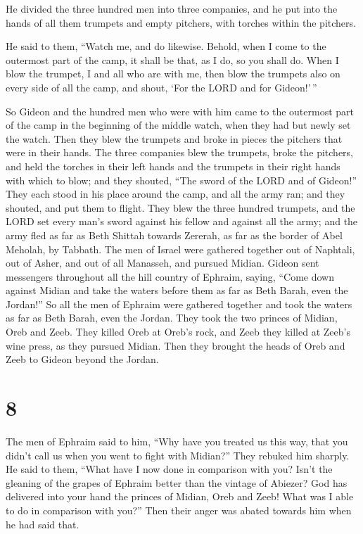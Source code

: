  He divided the three hundred men into three companies,
and he put into the hands of all them trumpets and empty pitchers, with
torches within the pitchers.

 He said to them, ``Watch me, and do likewise. Behold,
when I come to the outermost part of the camp, it shall be that, as I
do, so you shall do.  When I blow the trumpet, I and all
who are with me, then blow the trumpets also on every side of all the
camp, and shout, `For the LORD and for Gideon!'\,''

 So Gideon and the hundred men who were with him came to
the outermost part of the camp in the beginning of the middle watch,
when they had but newly set the watch. Then they blew the trumpets and
broke in pieces the pitchers that were in their hands. 
The three companies blew the trumpets, broke the pitchers, and held the
torches in their left hands and the trumpets in their right hands with
which to blow; and they shouted, ``The sword of the LORD and of
Gideon!''  They each stood in his place around the camp,
and all the army ran; and they shouted, and put them to flight.
 They blew the three hundred trumpets, and the LORD set
every man's sword against his fellow and against all the army; and the
army fled as far as Beth Shittah towards Zererah, as far as the border
of Abel Meholah, by Tabbath.  The men of Israel were
gathered together out of Naphtali, out of Asher, and out of all
Manasseh, and pursued Midian.  Gideon sent messengers
throughout all the hill country of Ephraim, saying, ``Come down against
Midian and take the waters before them as far as Beth Barah, even the
Jordan!'' So all the men of Ephraim were gathered together and took the
waters as far as Beth Barah, even the Jordan.  They took
the two princes of Midian, Oreb and Zeeb. They killed Oreb at Oreb's
rock, and Zeeb they killed at Zeeb's wine press, as they pursued Midian.
Then they brought the heads of Oreb and Zeeb to Gideon beyond the
Jordan.

\hypertarget{section-7}{%
\section{8}\label{section-7}}

 The men of Ephraim said to him, ``Why have you treated us
this way, that you didn't call us when you went to fight with Midian?''
They rebuked him sharply.  He said to them, ``What have I
now done in comparison with you? Isn't the gleaning of the grapes of
Ephraim better than the vintage of Abiezer?  God has
delivered into your hand the princes of Midian, Oreb and Zeeb! What was
I able to do in comparison with you?'' Then their anger was abated
towards him when he had said that.

